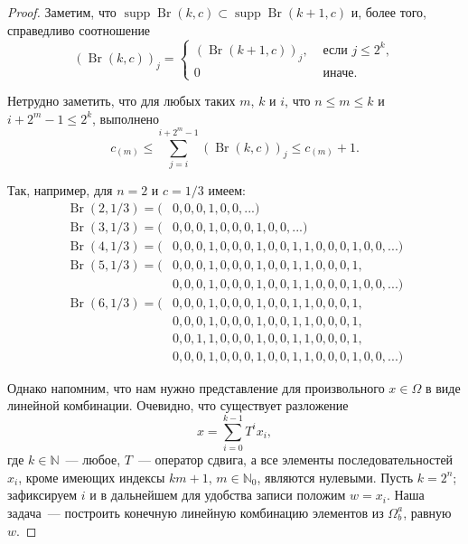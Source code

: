 \documentclass[a4paper,14pt]{article} %
\theoremstyle{plain}
\begin{document}
\begin{proof}
	Заметим, что $\operatorname{supp}\operatorname{Br}(k,c) \subset \operatorname{supp}\operatorname{Br}(k+1,c)$
	и, более того, справедливо соотношение
	\begin{equation}
		(\operatorname{Br}(k,c))_j = \begin{cases}
			(\operatorname{Br}(k+1,c))_j, & \mbox{~если~}  j \leq 2^k,
			\\
			0  & \mbox{~иначе}
			.
		\end{cases}
	\end{equation}

	Нетрудно заметить, что для любых таких $m$, $k$ и $i$, что $n \leq m \leq k$ и  $ i + 2^m - 1 \leq 2^k$,
	выполнено
	\begin{equation}
		c_{(m)} \leq \sum_{j=i}^{i+2^m-1} (\operatorname{Br}(k,c))_j \leq c_{(m)}+1
		.
	\end{equation}


	Так, например, для $n=2$ и $c=1/3$ имеем:
	\begin{equation*}
		\begin{array}{ll}
			\operatorname{Br}(2,1/3) = (&0,0,0,1,0,0,...)
			\\
			\operatorname{Br}(3,1/3) = (&0,0,0,1,0,0,0,1,0,0,...)
			\\
			\operatorname{Br}(4,1/3) = (&0,0,0,1, 0,0,0,1,   0,0,1,1, 0,0,0,1,  0,0,...)
			\\
			\operatorname{Br}(5,1/3) = (&
			                             0,0,0,1, 0,0,0,1,   0,0,1,1, 0,0,0,1,\\
			                           & 0,0,0,1, 0,0,0,1,   0,0,1,1, 0,0,0,1,
			0,0,...)
			\\
			\operatorname{Br}(6,1/3) = (&
			                             0,0,0,1, 0,0,0,1,   0,0,1,1, 0,0,0,1,\\
			                           & 0,0,0,1, 0,0,0,1,   0,0,1,1, 0,0,0,1,\\
			                           & 0,0,1,1, 0,0,0,1,   0,0,1,1, 0,0,0,1,\\
			                           & 0,0,0,1, 0,0,0,1,   0,0,1,1, 0,0,0,1,
			0,0,...)
		\end{array}
	\end{equation*}

	Однако напомним, что нам нужно представление для произвольного $x\in\Omega$ в виде линейной комбинации.
	Очевидно, что существует разложение
	\begin{equation}
		x = \sum_{i=0}^{k-1} T^i x_i
		,
	\end{equation}
	где $k\in\mathbb{N}$~--- любое, $T$~--- оператор сдвига, а все элементы последовательностей $x_i$,
	кроме имеющих индексы $km+1$, $m\in\mathbb{N}_0$, являются нулевыми.
	Пусть $k=2^n$; зафиксируем $i$ и в дальнейшем для удобства записи положим $w=x_i$.
	Наша задача~--- построить конечную линейную комбинацию элементов из $\Omega^a_b$, равную $w$.


\end{proof}
\end{document}
